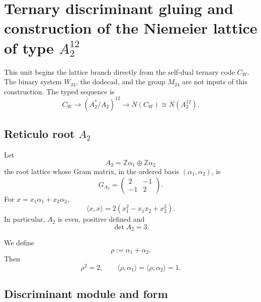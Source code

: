 
\section{Ternary discriminant gluing and construction of the Niemeier lattice of type \texorpdfstring{\(A_2^{12}\)}{A₂¹²}}
\label{p12-83-c20-s4:chap:pegado-niemeier-a2-doce}

This unit begins the lattice branch directly from the self-dual ternary code
\(C_W\). The binary system \(W_{24}\), the dodecad, and the group
\(M_{24}\) are not inputs of this construction. The typed sequence is
\[
 C_W
 \longrightarrow
 (A_2^*/A_2)^{12}
 \longrightarrow
 N(C_W)
 \cong N(A_2^{12}).
\]

\subsection{Reticulo root \texorpdfstring{\(A_2\)}{A₂}}

Let
\[
 A_2=\mathbb Z\alpha_1\oplus\mathbb Z\alpha_2
\]
the root lattice whose Gram matrix, in the ordered basis
\((\alpha_1,\alpha_2)\), is
\begin{equation}
 G_{A_2}=
 \begin{pmatrix}
 2&-1\\
 -1&2
 \end{pmatrix}.
 \label{p12-83-c20-s4:eq:gram-a2-autonomo}
\end{equation}
For \(x=x_1\alpha_1+x_2\alpha_2\),
\begin{equation}
 \langle x,x\rangle
 =2(x_1^2-x_1x_2+x_2^2).
 \label{p12-83-c20-s4:eq:norma-a2-autonoma}
\end{equation}
In particular, \(A_2\) is even, positive defined and
\[
 \det A_2=3.
\]

We define
\[
 \rho:=\alpha_1+\alpha_2.
\]
Then
\begin{equation}
 \rho^2=2,
 \qquad
 \langle\rho,\alpha_1\rangle
 =\langle\rho,\alpha_2\rangle=1.
 \label{p12-83-c20-s4:eq:identidades-rho-a2}
\end{equation}

\subsection{Discriminant module and form}

